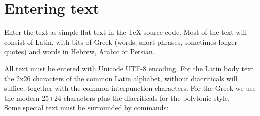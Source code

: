 \documentclass{report}
\begin{document}
\section{Entering text}

Enter the text as simple flat text in the \TeX{} source code.
Most of the text will consist of Latin,
with bits of Greek (words, short phrases, sometimes longer quotes) and words
in Hebrew, Arabic or Persian.

All text must be entered with Unicode UTF-8 encoding.
For the Latin body text the 2x26 characters of the common Latin alphabet,
without diacriticals will suffice, together with the common interpunction
characters.
For the Greek we use the modern 25+24 characters plus the diacriticals
for the polytonic style.
\\
Some special text must be surrounded by commands:
\end{document}
